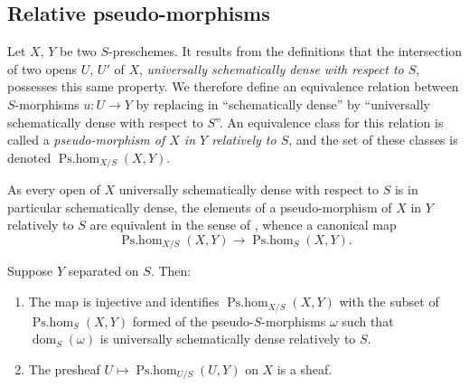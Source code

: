 \subsection{Relative pseudo-morphisms}
\label{IV.20.5}

\begin{env}[20.5.1]
\label{IV.20.5.1}
Let $X$, $Y$ be two $S$-preschemes.
It results from the definitions  that the intersection of two opens $U$, $U'$ of $X$, \emph{universally schematically dense with respect to $S$}, possesses this same property.
We therefore define an equivalence relation between $S$-morphisms $u:U\to Y$ by replacing in  ``schematically dense'' by ``universally schematically dense with respect to $S$''.
An equivalence class for this relation is called a \emph{pseudo-morphism of $X$ in $Y$ relatively to $S$}, and the set of these classes is denoted $\operatorname{Ps.hom}_{X/S}(X,Y)$.
\end{env}

\begin{env}[20.5.2]
\label{IV.20.5.2}
As every open of $X$ universally schematically dense with respect to $S$ is in particular schematically dense, the elements of a pseudo-morphism
of $X$ in $Y$ relatively to $S$ are equivalent in the sense of , whence a canonical map
\[
\label{IV.20.5.2.1}
  \operatorname{Ps.hom}_{X/S}(X,Y)\to\operatorname{Ps.hom}_S(X,Y).
  \tag{20.5.2.1}
\]
\end{env}

\begin{proposition}[20.5.3]
\label{IV.20.5.3}
Suppose $Y$ separated on $S$.
Then:
\begin{enumerate}[label=\emph{(\roman*)}]
  \item The map  is injective and identifies $\operatorname{Ps.hom}_{X/S}(X,Y)$ with the subset of $\operatorname{Ps.hom}_S(X,Y)$ formed of the pseudo-$S$-morphisms $\omega$ such that $\operatorname{dom}_S(\omega)$ is universally schematically dense relatively to $S$.
  \item The presheaf $U\mapsto\operatorname{Ps.hom}_{U/S}(U,Y)$ on $X$ is a sheaf.
\end{enumerate}
\end{proposition}

